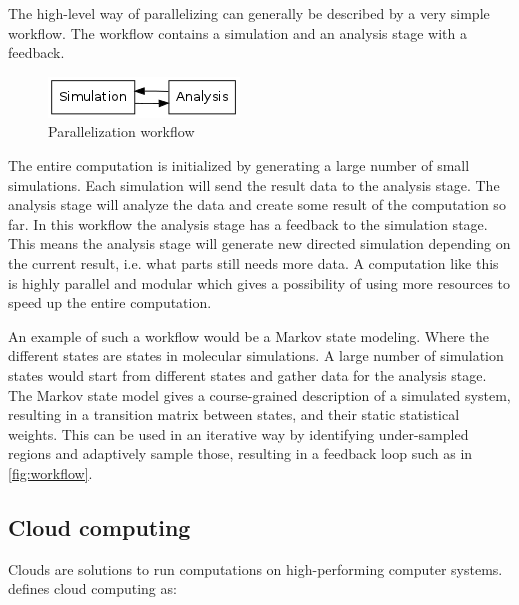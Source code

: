 The high-level way of parallelizing can generally be described by a very
simple workflow. The workflow contains a simulation and an analysis
stage with a feedback. 

\begin{figure}[H]  
  \centering
  \includegraphics{Chapters/IntroductionIncludes/workflow.png}
  \caption{Parallelization workflow}
  \label{fig:workflow}
\end{figure}

The entire computation is initialized by generating a large number of
small simulations. Each simulation will send the result data to the
analysis stage. The analysis stage will analyze the data and create
some result of the computation so far. In this workflow the analysis
stage has a feedback to the simulation stage. This means the analysis
stage will generate new directed simulation depending on the current
result, i.e. what parts still needs more data. A computation like this
is highly parallel and modular which gives a possibility of using more
resources to speed up the entire computation.

An example of such a workflow would be a Markov state modeling. Where
the different states are states in molecular simulations. A large
number of simulation states would start from different states and
gather data for the analysis stage. The Markov state model gives a
course-grained description of a simulated system, resulting in a
transition matrix between states, and their static statistical
weights. This can be used in an iterative way by identifying
under-sampled regions and adaptively sample those, resulting in a
feedback loop such as in \autoref{fig:workflow}.





\subsection{Cloud computing}
Clouds are solutions to run computations on high-performing computer
systems. \citet{foster:2008} defines cloud computing as:

